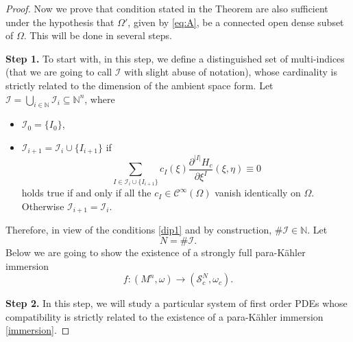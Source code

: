 \documentclass{article}
\newcommand{\I}{\mathcal{I}}
\newcommand{\de}{\partial}
\newcommand{\s}{\mathcal{S}}
\newcommand{\pk}{para-K\"ahler }
\newcommand{\N}{\mathds{N}}
\begin{document}
\begin{proof}
\medskip\noindent
Now we prove that condition stated in the Theorem are also sufficient under the hypothesis that $\Omega'$, given by \eqref{eq:A}, be a connected open dense subset of $\Omega$.
This will be done in several steps.



\bigskip\noindent
\textbf{\large Step 1.} To start with, in this step, we define a distinguished set of multi-indices (that we are going to call $\I$ with slight abuse of notation), whose cardinality is strictly related to the dimension of the ambient space form. 
%
\smallskip\noindent
 Let  $\mathcal{I}=\bigcup_{i\in\N}\mathcal{I}_i\subseteq\N^n$, where
\begin{itemize}
\item $\mathcal{I}_0=\{I_0\}$,
\item $\mathcal{I}_{i+1}=\mathcal{I}_i\cup\{I_{i+1}\}$ 
 if   
$$ \sum_{I\in\mathcal{I}_i\cup\{I_{i+1}\}}c_I(\xi)\frac{\de^{|I|} H_c}{\de\xi^I}(\xi,\eta)\equiv 0$$
holds true if and only if all the $c_I\in \mathcal{C}^\infty(\Omega)$ vanish identically on $\Omega$. 
Otherwise $\mathcal{I}_{i+1}=\mathcal{I}_i$.
\end{itemize}
Therefore, in view of the conditions \eqref{dip1} and by construction, $\#\I\in\N$. Let$$N=\#\I.$$
Below we are going to show the existence of a  strongly full  \pk immersion  
$$f: (M^n,\omega)\to (\s_c^{N},\omega_c).$$





\medskip\noindent
\textbf{\large Step 2.} In this step, we will study a particular system of first order PDEs whose compatibility is strictly related to the existence of a \pk immersion \eqref{immersion}.


\end{proof}
\end{document}
